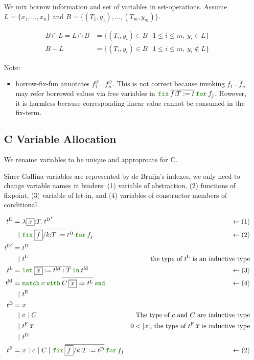 \documentclass[a4paper,fleqn]{article}
\def\gallina{\textrm{Gallina}}
\newcommand{\kwlet}{\mbox{\color{mygreen}\ttfamily let}}
\newcommand{\kwin}{\mbox{\color{mygreen}\ttfamily in}}
\newcommand{\kwmatch}{\mbox{\color{mygreen}\ttfamily match}}
\newcommand{\kwwith}{\mbox{\color{mygreen}\ttfamily with}}
\newcommand{\kwend}{\mbox{\color{mygreen}\ttfamily end}}
\newcommand{\kwfix}{\mbox{\color{mygreen}\ttfamily fix}}
\newcommand{\kwfor}{\mbox{\color{mygreen}\ttfamily for}}
\newcommand{\lamT}[3]{\lambda #1\mathord{:}#2.\:#3}
\newcommand{\letinM}[3]{\kwlet\:\rep{#1:=#2}\:\kwin\:#3}
\newcommand{\omatch}[2]{\kwmatch\:#1\:\kwwith\:{#2}\:\kwend}
\newcommand{\ofix}[2]{\kwfix\:{#1}\:\kwfor\:{#2}}
\newcommand{\tD}{{t^\mathrm{D}}}
\newcommand{\tE}{{t^\mathrm{E}}}
\newcommand{\tL}{{t^\mathrm{L}}}
\newcommand{\tM}{{t^\mathrm{M}}}
\newcommand{\tF}{{t^\mathrm{F}}}
\newcommand{\rep}[1]{\overline{#1}}
\begin{document}
We mix borrow information and set of variables in set-operations.
Assume $L=\{x_1,\ldots,x_n\}$ and $B=\{(T_1,y_1),\ldots,(T_m,y_m)\}$.

\begin{align*}
  B \cap L = L \cap B &= \{(T_i,y_i) \in B ~|~ 1\leq i\leq m,~ y_i \in L \} \\
  B - L &= \{(T_i,y_i) \in B ~|~ 1\leq i\leq m,~ y_i \not\in L \}
\end{align*}

{\small Note:
\begin{itemize}
  \item borrow-fix-fun annotates $f_1^\varnothing \ldots f_n^\varnothing$.
    This is not correct because invoking $f_1\ldots f_n$ may refer borrowed values via free variables in
    $\ofix{\overline{f{:}T:=t}}{f_j}$.
    However, it is harmless because corresponding linear value cannot be consumed in the fix-term.
\end{itemize}}

\subsection{C Variable Allocation}\label{sec:cvaralloc}

We rename variables to be unique and approproate for C.

Since \gallina{} variables are represented by de Bruijn's indexes,
we only need to change variable names in binders:
(1) variable of abstraction,
(2) functions of fixpoint,
(3) variable of let-in, and
(4) variables of constructor members of conditional.

\begin{align*}
  \tD =&\ \lamT{\fbox{$x$}}{T}{\tD'} & \leftarrow (1) \\
      |&\ \ofix{\overline{\fbox{$f$}/k{:}T:=\tD}}{f_j} & \leftarrow (2) \\
  \tD' =&\ \tD \\
       |&\ \tL & \text{the type of $\tL$ is an inductive type} \\
  \tL =&\ \letinM{\fbox{$x$}}{\tM:T}{\tM} & \leftarrow (3) \\
  \tM =&\ \omatch{x}{\overline{C\:\overline{\fbox{$x$}}\Rightarrow \tL}} & \leftarrow (4) \\
      |&\ \tE \\
  \tE =&\ x \\
    |&\ c ~|~ C & \text{The type of $c$ and $C$ are inductive type} \\
    |&\ \tF\:\rep{x} & \text{$0 < |x|$, the type of $\tF\:\rep{x}$ is inductive type}  \\
    |&\ \tD \\
  \tF =&\ x ~|~ c ~|~ C ~|~ \ofix{\overline{\fbox{$f$}/k{:}T:=\tD}}{f_j} & \leftarrow (2)
\end{align*}
\end{document}
